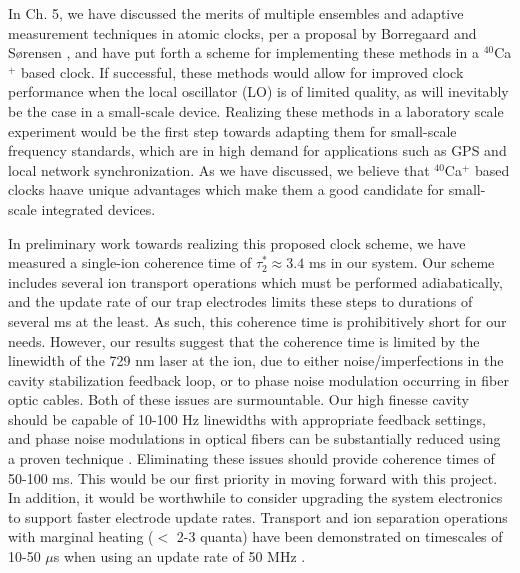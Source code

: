 In Ch. 5, we have discussed the merits of multiple ensembles and adaptive measurement techniques in atomic clocks, per a proposal by Borregaard and S\o rensen \cite{BorregaardSorensen}, and have put forth a scheme for implementing these methods in a $^{40}$Ca$^+$ based clock. If successful, these methods would allow for improved clock performance when the local oscillator (LO) is of limited quality, as will inevitably be the case in a small-scale device. Realizing these methods in a laboratory scale experiment would be the first step towards adapting them for small-scale frequency standards, which are in high demand for applications such as GPS and local network synchronization. As we have discussed, we believe that $^{40}$Ca$^+$ based clocks haave unique advantages which make them a good candidate for small-scale integrated devices.   

In preliminary work towards realizing this proposed clock scheme, we have measured a single-ion coherence time of $\tau_2^* \approx 3.4$ ms in our system. Our scheme includes several ion transport operations which must be performed adiabatically, and the update rate of our trap electrodes limits these steps to durations of several ms at the least. As such, this coherence time is prohibitively short for our needs. However, our results suggest that the coherence time is limited by the linewidth of the 729 nm laser at the ion, due to either noise/imperfections in the cavity stabilization feedback loop, or to phase noise modulation occurring in fiber optic cables. Both of these issues are surmountable. Our high finesse cavity should be capable of 10-100 Hz linewidths with appropriate feedback settings, and phase noise modulations in optical fibers can be substantially reduced using a proven technique \cite{Ma:94}. Eliminating these issues should provide coherence times of 50-100 ms. This would be our first priority in moving forward with this project. In addition, it would be worthwhile to consider upgrading the system electronics to support faster electrode update rates. Transport and ion separation operations with marginal heating ($<$ 2-3 quanta) have been demonstrated on timescales of 10-50 $\mu$s when using an update rate of 50 MHz \cite{PhysRevLett.109.080502}.

